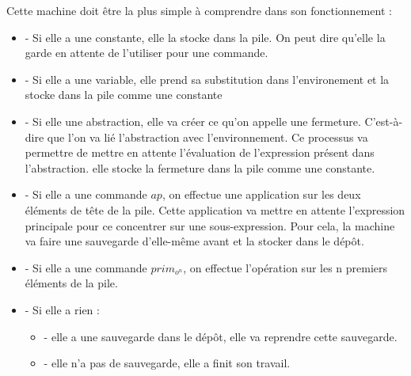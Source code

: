 \documentclass[10pt,a4paper]{report}
\begin{document}
Cette machine doit être la plus simple à comprendre dans son fonctionnement :
\begin{itemize}
\item[] - Si elle a une constante, elle la stocke dans la pile. On peut dire qu'elle la garde en attente de l'utiliser pour une commande. 
\item[] - Si elle a une variable, elle prend sa substitution dans l'environement et la stocke dans la pile comme une constante
\item[] - Si elle une abstraction, elle va créer ce qu'on appelle une fermeture. C'est-à-dire que l'on va lié l'abstraction avec l'environnement. Ce processus va permettre de mettre en attente l'évaluation de l'expression présent dans l'abstraction. elle stocke la fermeture dans la pile comme une constante.
\item[] - Si elle a une commande $ap$, on effectue une application sur les deux éléments de tête de la pile. Cette application va mettre en attente l'expression principale pour ce concentrer sur une sous-expression. Pour cela, la machine va faire une sauvegarde d'elle-même avant et la stocker dans le dépôt.
\item[] - Si elle a une commande $prim_{o^{n}}$, on effectue l'opération sur les n premiers éléments de la pile.
\item[] - Si elle a rien :
  \begin{itemize}
  \item[] - elle a une sauvegarde dans le dépôt, elle va reprendre cette sauvegarde.
  \item[] - elle n'a pas de sauvegarde, elle a finit son travail.
  \end{itemize}
\end{itemize}
\bigbreak
\end{document}
